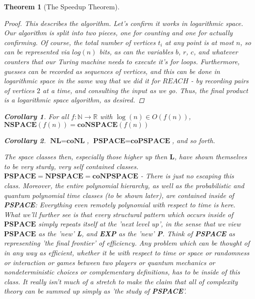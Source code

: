 \documentclass{article}
\theoremstyle{definition}
\theoremstyle{plain}
\theoremstyle{theorem}
\newtheorem{theorem}{Theorem}[section]
\newtheorem{corollary}{Corollary}[section]
\begin{document}
\begin{theorem}[The Speedup Theorem]
\begin{proof}
    \par This describes the algorithm. Let's confirm it works in logarithmic space. Our algorithm is split into two pieces, one for counting and one for actually confirming. Of course, the total number of vertices $t_i$ at any point is at most $n$, so can be represented via $log(n)$ bits, as can the variables $b$, $r$, $c$, and whatever counters that our Turing machine needs to execute it's for loops. Furthermore, guesses can be recorded as sequences of vertices, and this can be done in logarithmic space in the same way that we did it for $REACH$ - by recording pairs of vertices $2$ at a time, and consulting the input as we go. Thus, the final product is a logarithmic space algorithm, as desired.
\end{proof}
\begin{corollary}
    For all $f: \mathbb{N} \to \mathbb{R}$ with $\log(n) \in O(f(n))$, $\textbf{NSPACE$(f(n))$} = \textbf{coNSPACE$(f(n))$}$
\end{corollary}
\begin{corollary}
    $\textbf{NL} = \textbf{coNL}$, $\textbf{PSPACE} = \textbf{coPSPACE}$, and so forth.
\end{corollary}
The space classes then, especially those higher up then $\textbf{L}$, have shown themselves to be very sturdy, very self contained classes. $\textbf{PSPACE} = \textbf{NPSPACE} = \textbf{coNPSPACE}$ - There is just no escaping this class. Moreover, the entire polynomial hierarchy, \textit{as well as } the probabilistic and quantum polynomial time classes (to be shown later), are contained inside of \textbf{PSPACE}: Everything even remotely polynomial with respect to time is here. What we'll further see is that every structural pattern which occurs inside of $\textbf{PSPACE}$ simply repeats itself at the 'next level up', in the sense that we view $\textbf{PSPACE}$ as the 'new' \textbf{L}, and \textbf{EXP} as the 'new' \textbf{P}. Think of \textbf{PSPACE} as representing 'the final frontier' of efficiency. Any problem which can be thought of in \textit{any way} as efficient, whether it be with respect to time or space or randomness or interaction or games between two players or quantum mechanics or nondeterministic choices or complementary definitions, \textit{has to be inside of this class}. It really isn't much of a stretch to make the claim that all of complexity theory can be summed up simply as 'the study of \textbf{PSPACE}'.


\end{theorem}
\end{document}
